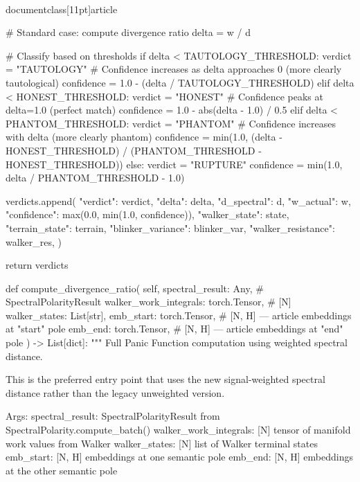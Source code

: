 \\documentclass[11pt]{article}
\begin{document}
\begin{CodeBlock}
            # Standard case: compute divergence ratio
            delta = w / d

            # Classify based on thresholds
            if delta < TAUTOLOGY_THRESHOLD:
                verdict = "TAUTOLOGY"
                # Confidence increases as delta approaches 0 (more clearly tautological)
                confidence = 1.0 - (delta / TAUTOLOGY_THRESHOLD)
            elif delta < HONEST_THRESHOLD:
                verdict = "HONEST"
                # Confidence peaks at delta=1.0 (perfect match)
                confidence = 1.0 - abs(delta - 1.0) / 0.5
            elif delta < PHANTOM_THRESHOLD:
                verdict = "PHANTOM"
                # Confidence increases with delta (more clearly phantom)
                confidence = min(1.0, (delta - HONEST_THRESHOLD) / (PHANTOM_THRESHOLD - HONEST_THRESHOLD))
            else:
                verdict = "RUPTURE"
                confidence = min(1.0, delta / PHANTOM_THRESHOLD - 1.0)

            verdicts.append({
                "verdict": verdict,
                "delta": delta,
                "d_spectral": d,
                "w_actual": w,
                "confidence": max(0.0, min(1.0, confidence)),
                "walker_state": state,
                "terrain_state": terrain,
                "blinker_variance": blinker_var,
                "walker_resistance": walker_res,
            })

        return verdicts

    def compute_divergence_ratio(
        self,
        spectral_result: Any,  # SpectralPolarityResult
        walker_work_integrals: torch.Tensor,  # [N]
        walker_states: List[str],
        emb_start: torch.Tensor,  # [N, H] — article embeddings at "start" pole
        emb_end: torch.Tensor,    # [N, H] — article embeddings at "end" pole
    ) -> List[dict]:
        """
        Full Panic Function computation using weighted spectral distance.

        This is the preferred entry point that uses the new signal-weighted
        spectral distance rather than the legacy unweighted version.

        Args:
            spectral_result: SpectralPolarityResult from SpectralPolarity.compute_batch()
            walker_work_integrals: [N] tensor of manifold work values from Walker
            walker_states: [N] list of Walker terminal states
            emb_start: [N, H] embeddings at one semantic pole
            emb_end: [N, H] embeddings at the other semantic pole


\end{CodeBlock}
\end{document}

